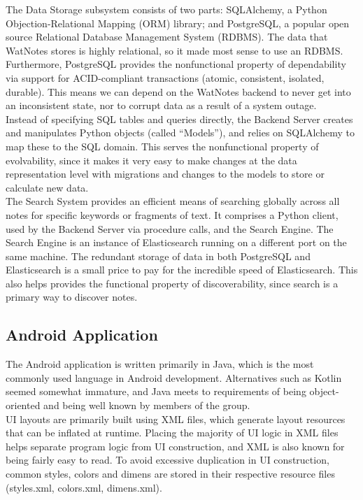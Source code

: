 \documentclass[12pt]{article}
\begin{document}
    The Data Storage subsystem consists of two parts: SQLAlchemy, a Python
    Objection-Relational Mapping (ORM) library; and PostgreSQL, a popular open
    source Relational Database Management System (RDBMS). The data that WatNotes
    stores is highly relational, so it made most sense to use an RDBMS.
    Furthermore, PostgreSQL provides the nonfunctional property of dependability
    via support for ACID-compliant transactions (atomic, consistent, isolated,
    durable). This means we can depend on the WatNotes backend to never get into
    an inconsistent state, nor to corrupt data as a result of a system outage.\\

    Instead of specifying SQL tables and queries directly, the Backend Server
    creates and manipulates Python objects (called ``Models''), and relies on
    SQLAlchemy to map these to the SQL domain. This serves the nonfunctional
    property of evolvability, since it makes it very easy to make changes at the
    data representation level with migrations and changes to the models to store
    or calculate new data.\\

    The Search System provides an efficient means of searching globally across
    all notes for specific keywords or fragments of text. It comprises a Python
    client, used by the Backend Server via procedure calls, and the Search
    Engine. The Search Engine is an instance of Elasticsearch running on a
    different port on the same machine. The redundant storage of data in both
    PostgreSQL and Elasticsearch is a small price to pay for the incredible
    speed of Elasticsearch. This also helps provides the functional property of
    discoverability, since search is a primary way to discover notes.

  \subsection{Android Application}
    The Android application is written primarily in Java, which is the most commonly used
    language in Android development. Alternatives such as Kotlin seemed somewhat immature, and
    Java meets to requirements of being object-oriented and being well known by members of
    the group. \\

    UI layouts are primarily built using XML files, which generate layout resources
    that can be inflated at runtime. Placing the majority of UI logic in XML files helps
    separate program logic from UI construction, and XML is also known for being fairly easy to read.
    To avoid excessive duplication in UI construction, common styles, colors and dimens are
    stored in their respective resource files (styles.xml, colors.xml, dimens.xml). \\
\end{document}
